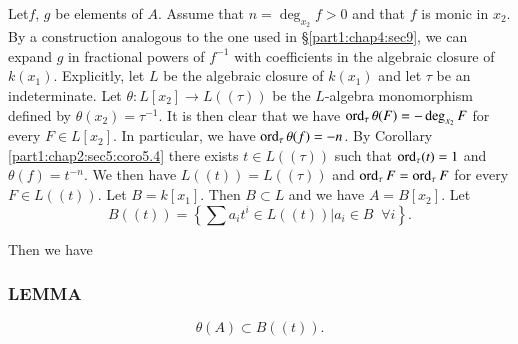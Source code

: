 Let\pageoriginale $f$, $g$ be elements of $A$. Assume that $n=
\deg_{x_2} f > 0$ and that $f$ is monic in $x_2$. By a construction
analogous to the one used in \S \ref{part1:chap4:sec9}, we can expand
$g$ in fractional powers of $f^{-1}$ with coefficients in the algebraic
closure of $k(x_1)$. Explicitly, let $L$ be the algebraic closure of
$k(x_1)$ and let $\tau$ be an indeterminate. Let $\theta: L[x_2]\to L
((\tau))$ be the $L$-algebra monomorphism defined by $\theta (x_2)=
\tau^{-1}$. It is then clear that we have $\operatorname{ord}_\tau \theta (F)= -
\deg_{x_2} F$ for every $F\in L [x_2]$. In particular, we have
$\operatorname{ord}_\tau \theta (f)=- n$. By Corollary
\ref{part1:chap2:sec5:coro5.4} there exists $t \in L ((\tau))$ such
that $\operatorname{ord}_\tau (t) =1$ and $\theta (f) = t^{-n}$. We then have
$L((t))= L((\tau))$ and $\operatorname{ord}_\tau F = \operatorname{ord}_\tau F$ for every $F \in L
((t))$. Let $B= k[x_1]$. Then $B \subset L$ and we have $A=
B[x_2]$. Let 
$$
B((t))= \left\{ \sum a_i t^i \in L ((t)) \Big| a_i \in B \;\;  \forall i \right\}.
$$ 

Then we have

\setcounter{mysubsection}{1}
\subsubsection{LEMMA}\label{part2:chap6:sec20:sss20.1.1} 
$$
\theta (A) \subset B((t)).
$$


